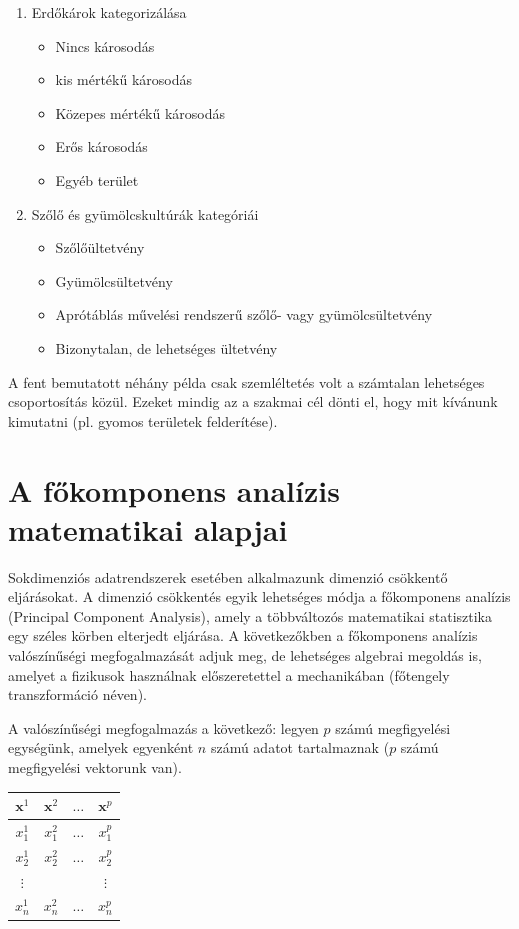 \documentclass[a4paper,12pt]{article}
\begin{document}
\begin{enumerate}
	\item Erdőkárok kategorizálása
		\begin{itemize}
		\item Nincs károsodás
		\item kis mértékű károsodás
		\item Közepes mértékű károsodás
		\item Erős károsodás
		\item Egyéb terület
		\end{itemize}	
	\item Szőlő és gyümölcskultúrák kategóriái
		\begin{itemize}
		\item Szőlőültetvény
		\item Gyümölcsültetvény
		\item Aprótáblás művelési rendszerű szőlő- vagy gyümölcsültetvény
		\item Bizonytalan, de lehetséges ültetvény
		\end{itemize}	
\end{enumerate}

A fent bemutatott néhány példa csak szemléltetés volt a számtalan lehetséges csoportosítás közül. Ezeket mindig az a szakmai cél dönti el, hogy mit kívánunk kimutatni (pl. gyomos területek felderítése).


\section{A főkomponens analízis matematikai alapjai} \label{pca_desc}

Sokdimenziós adatrendszerek esetében alkalmazunk dimenzió csökkentő eljárásokat. A dimenzió csökkentés egyik lehetséges módja a főkomponens analízis (Principal Component Analysis), amely a többváltozós matematikai statisztika egy széles körben elterjedt eljárása. A következőkben a főkomponens analízis valószínűségi megfogalmazását adjuk meg, de lehetséges algebrai megoldás is, amelyet a fizikusok használnak előszeretettel a mechanikában (főtengely transzformáció néven).

A valószínűségi megfogalmazás a következő: legyen $p$ számú megfigyelési egységünk, amelyek egyenként $n$ számú adatot tartalmaznak ($p$ számú megfigyelési vektorunk van). 

\begin{center}
	\begin{tabular}{|c|c|c|c|}
		\hline
		$\mathbf{x}^1$ & $\mathbf{x}^2$ & $\ldots$ & $\mathbf{x}^p$ \\
		\hline
		$x_1^1$ & $x_1^2$ & $\ldots$ & $x_1^p$ \\
		\hline
		$x_2^1$ & $x_2^2$ & $\ldots$ & $x_2^p$ \\
		\hline
		$\vdots$ &  &  & $\vdots$ \\
		$x_n^1$ & $x_n^2$ & $\ldots$ & $x_n^p$ \\
		\hline
	\end{tabular}
\end{center}
\end{document}
